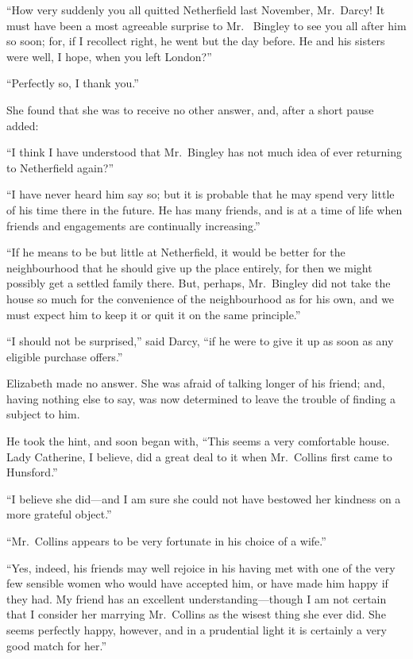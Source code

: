 ``How very suddenly you all quitted Netherfield last November,
Mr.\ Darcy!  It must have been a most agreeable surprise to Mr.\ %
Bingley to see you all after him so soon; for, if I recollect right,
he went but the day before.  He and his sisters were well, I hope,
when you left London?''

``Perfectly so, I thank you.''

She found that she was to receive no other answer, and, after a
short pause added:

``I think I have understood that Mr.\ Bingley has not much idea of
ever returning to Netherfield again?''

``I have never heard him say so; but it is probable that he may
spend very little of his time there in the future.  He has many
friends, and is at a time of life when friends and engagements are
continually increasing.''

``If he means to be but little at Netherfield, it would be better for
the neighbourhood that he should give up the place entirely, for
then we might possibly get a settled family there.  But, perhaps,
Mr.\ Bingley did not take the house so much for the convenience
of the neighbourhood as for his own, and we must expect him to
keep it or quit it on the same principle.''

``I should not be surprised,'' said Darcy, ``if he were to give it up
as soon as any eligible purchase offers.''

Elizabeth made no answer.  She was afraid of talking longer of
his friend; and, having nothing else to say, was now determined
to leave the trouble of finding a subject to him.

He took the hint, and soon began with, ``This seems a very
comfortable house.  Lady Catherine, I believe, did a great deal to
it when Mr.\ Collins first came to Hunsford.''

``I believe she did---and I am sure she could not have bestowed
her kindness on a more grateful object.''

``Mr.\ Collins appears to be very fortunate in his choice of a wife.''

``Yes, indeed, his friends may well rejoice in his having met with
one of the very few sensible women who would have accepted
him, or have made him happy if they had.  My friend has an
excellent understanding---though I am not certain that I consider
her marrying Mr.\ Collins as the wisest thing she ever did.  She
seems perfectly happy, however, and in a prudential light it is
certainly a very good match for her.''

